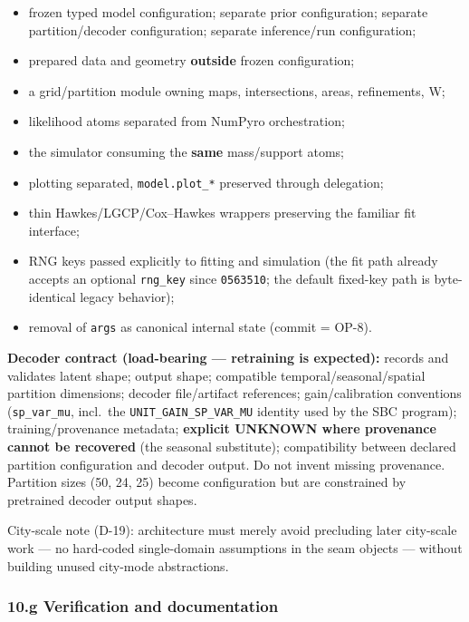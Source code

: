 \documentclass[
  10pt,
]{article}
\providecommand{\tightlist}{%
  \setlength{\itemsep}{0pt}\setlength{\parskip}{0pt}}
\begin{document}
\begin{itemize}
\tightlist
\item
  frozen typed model configuration; separate prior configuration; separate partition/decoder configuration; separate inference/run configuration;
\item
  prepared data and geometry \textbf{outside} frozen configuration;
\item
  a grid/partition module owning maps, intersections, areas, refinements, W;
\item
  likelihood atoms separated from NumPyro orchestration;
\item
  the simulator consuming the \textbf{same} mass/support atoms;
\item
  plotting separated, \texttt{model.plot\_*} preserved through delegation;
\item
  thin Hawkes/LGCP/Cox--Hawkes wrappers preserving the familiar fit interface;
\item
  RNG keys passed explicitly to fitting and simulation (the fit path already accepts an optional \texttt{rng\_key} since \texttt{0563510}; the default fixed-key path is byte-identical legacy behavior);
\item
  removal of \texttt{args} as canonical internal state (commit = OP-8).
\end{itemize}

\textbf{Decoder contract (load-bearing --- retraining is expected):} records and validates latent shape; output shape; compatible temporal/seasonal/spatial partition dimensions; decoder file/artifact references; gain/calibration conventions (\texttt{sp\_var\_mu}, incl.~the \texttt{UNIT\_GAIN\_SP\_VAR\_MU} identity used by the SBC program); training/provenance metadata; \textbf{explicit UNKNOWN where provenance cannot be recovered} (the seasonal substitute); compatibility between declared partition configuration and decoder output. Do not invent missing provenance. Partition sizes (50, 24, 25) become configuration but are constrained by pretrained decoder output shapes.

City-scale note (D-19): architecture must merely avoid precluding later city-scale work --- no hard-coded single-domain assumptions in the seam objects --- without building unused city-mode abstractions.

\hypertarget{g-verification-and-documentation}{%
\subsubsection{10.g Verification and documentation}\label{g-verification-and-documentation}}
\end{document}
